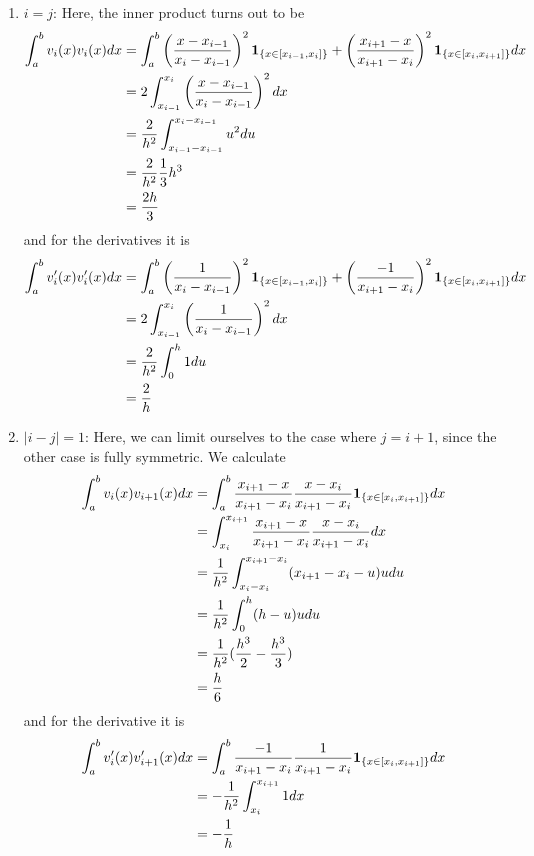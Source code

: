 \documentclass[11pt, a4paper]{article}
\begin{document}
\begin{enumerate}
    \item $i = j$: Here, the inner product turns out to be
    \begin{align}
        \int_a^b v_i(x) v_i(x) dx &= \int_{a}^{b} \left(\frac{x-x_{i-1}}{x_{i}-x_{i-1}} \right)^2 \mathbf{1}_{\{x \in [x_{i-1}, x_i]\}} + 
        \left(\frac{x_{i+1}-x}{x_{i+1}-x_i}\right)^2 \mathbf{1}_{\{x \in [x_i, x_{i+1}]\}} dx \notag \\ 
        &= 2 \int_{x_{i-1}}^{x_i} \left(\frac{x-x_{i-1}}{x_{i}-x_{i-1}} \right)^2 dx \notag \\ 
        &= \frac{2}{h^2} \int_{x_{i-1}-x_{i-1}}^{x_i - x_{i-1}} u^2 du \notag \\
        &= \frac{2}{h^2} \frac{1}{3} h^3 \notag \\
        &= \frac{2h}{3} \notag \\
     \end{align}
     and for the derivatives it is
     \begin{align}
        \int_a^b v_i'(x) v_i'(x) dx &= \int_{a}^{b} \left(\frac{1}{x_{i}-x_{i-1}} \right)^2 \mathbf{1}_{\{x \in [x_{i-1}, x_i]\}} + 
        \left(\frac{-1}{x_{i+1}-x_i}\right)^2 \mathbf{1}_{\{x \in [x_i, x_{i+1}]\}} dx \notag \\ 
        &= 2 \int_{x_{i-1}}^{x_i} \left(\frac{1}{x_{i}-x_{i-1}} \right)^2 dx \notag \\ 
        &= \frac{2}{h^2} \int_0^h 1 du \notag \\
        &= \frac{2}{h}
     \end{align}
    \item $|i - j| = 1$: Here, we can limit ourselves to the case where $j = i+1$,
    since the other case is fully symmetric. We calculate
    \begin{align}
        \int_a^b v_i(x) v_{i+1}(x) dx &= \int_{a}^{b} \frac{x_{i+1}-x}{x_{i+1}-x_i} \frac{x-x_i}{x_{i+1}-x_i} \mathbf{1}_{\{x \in [x_i, x_{i+1}]\}} dx \notag \\ 
            &= \int_{x_i}^{x_{i+1}} \frac{x_{i+1}-x}{x_{i+1}-x_i} \frac{x-x_i}{x_{i+1}-x_i} dx \notag \\ 
            &= \frac{1}{h^2} \int_{x_i-x_i}^{x_{i+1}-x_i} (x_{i+1}-x_i-u) u du \notag \\ 
            &= \frac{1}{h^2} \int_0^h (h - u) u du \notag \\
            &= \frac{1}{h^2} (\frac{h^3}{2} - \frac{h^3}{3}) \notag \\ 
            &= \frac{h}{6}
    \end{align}
    and for the derivative it is 
    \begin{align}
        \int_a^b v_i'(x) v_{i+1}'(x) dx &= \int_{a}^{b} \frac{-1}{x_{i+1}-x_i} \frac{1}{x_{i+1}-x_i} \mathbf{1}_{\{x \in [x_i, x_{i+1}]\}} dx \notag \\ 
            &= -\frac{1}{h^2} \int_{x_i}^{x_{i+1}} 1 dx \notag \\ 
            &= -\frac{1}{h}
    \end{align}
\end{enumerate}
\end{document}

